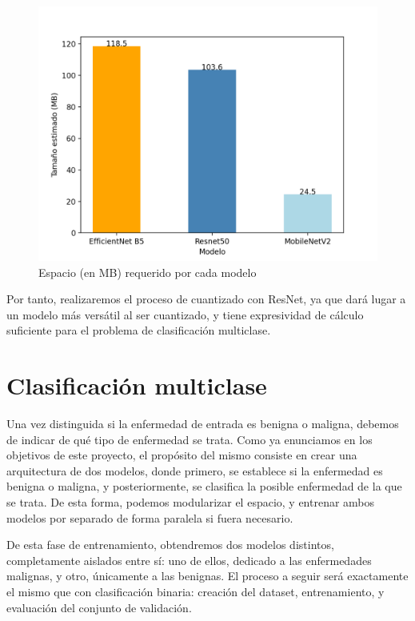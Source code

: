 \begin{figure}[H]
	\centering
	\includegraphics[scale = 0.6]{imagenes/tamestimado.png}
	\caption{Espacio (en MB) requerido por cada modelo}
	\label {fig:tam}
\end{figure}

Por tanto, realizaremos el proceso de cuantizado con ResNet, ya que dará lugar a un modelo más versátil al ser cuantizado, y tiene expresividad de cálculo suficiente para el problema de clasificación multiclase. 


\section {Clasificación multiclase}

Una vez distinguida si la enfermedad de entrada es benigna o maligna, debemos de indicar de qué tipo de enfermedad se trata.  Como ya enunciamos en los objetivos de este proyecto, el propósito  del mismo consiste en crear una arquitectura de dos modelos, donde primero, se establece si la enfermedad es benigna o maligna, y posteriormente, se clasifica la posible enfermedad de la que se trata. De esta forma, podemos modularizar el espacio, y entrenar ambos modelos por separado de forma paralela si fuera necesario.

De esta fase de entrenamiento, obtendremos dos modelos distintos, completamente aislados entre sí: uno de ellos, dedicado a las enfermedades malignas, y otro, únicamente a las benignas. El proceso a seguir será exactamente el mismo que con clasificación binaria: creación del dataset, entrenamiento, y evaluación del conjunto de validación.


